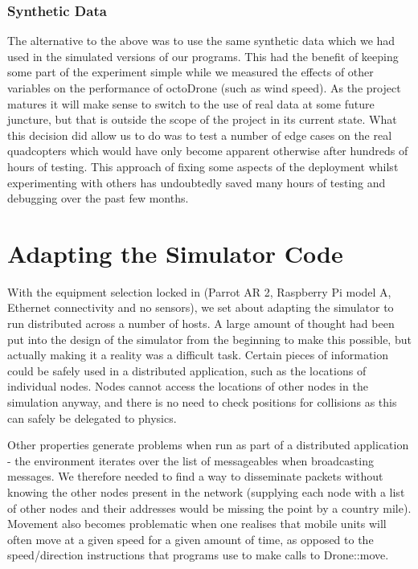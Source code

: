 \subsubsection{Synthetic Data}
The alternative to the above was to use the same synthetic data which we had used in the simulated versions of our programs. This had the benefit of keeping some part of the experiment simple while we measured the effects of other variables on the performance of octoDrone (such as wind speed). As the project matures it will make sense to switch to the use of real data at some future juncture, but that is outside the scope of the project in its current state. What this decision did allow us to do was to test a number of edge cases on the real quadcopters which would have only become apparent otherwise after hundreds of hours of testing. This approach of fixing some aspects of the deployment whilst experimenting with others has undoubtedly saved many hours of testing and debugging over the past few months.

\section{Adapting the Simulator Code}
With the equipment selection locked in (Parrot AR 2, Raspberry Pi model A, Ethernet connectivity and no sensors), we set about adapting the simulator to run distributed across a number of hosts. A large amount of thought had been put into the design of the simulator from the beginning to make this possible, but actually making it a reality was a difficult task. Certain pieces of information could be safely used in a distributed application, such as the locations of individual nodes. Nodes cannot access the locations of other nodes in the simulation anyway, and there is no need to check positions for collisions as this can safely be delegated to physics.

Other properties generate problems when run as part of a distributed application - the environment iterates over the list of messageables when broadcasting messages. We therefore needed to find a way to disseminate packets without knowing the other nodes present in the network (supplying each node with a list of other nodes and their addresses would be missing the point by a country mile). Movement also becomes problematic when one realises that mobile units will often move at a given speed for a given amount of time, as opposed to the speed/direction instructions that programs use to make calls to Drone::move.

